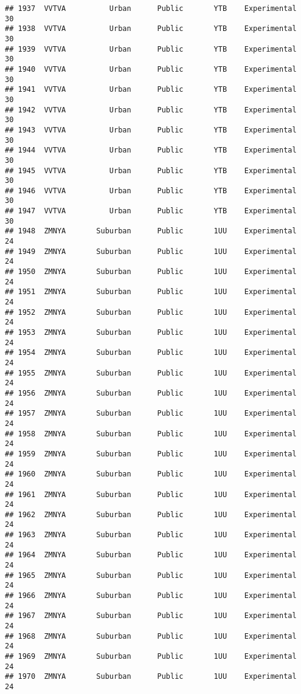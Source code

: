 \documentclass[
]{article}
\begin{document}
\begin{verbatim}
## 1937  VVTVA          Urban      Public       YTB    Experimental        30
## 1938  VVTVA          Urban      Public       YTB    Experimental        30
## 1939  VVTVA          Urban      Public       YTB    Experimental        30
## 1940  VVTVA          Urban      Public       YTB    Experimental        30
## 1941  VVTVA          Urban      Public       YTB    Experimental        30
## 1942  VVTVA          Urban      Public       YTB    Experimental        30
## 1943  VVTVA          Urban      Public       YTB    Experimental        30
## 1944  VVTVA          Urban      Public       YTB    Experimental        30
## 1945  VVTVA          Urban      Public       YTB    Experimental        30
## 1946  VVTVA          Urban      Public       YTB    Experimental        30
## 1947  VVTVA          Urban      Public       YTB    Experimental        30
## 1948  ZMNYA       Suburban      Public       1UU    Experimental        24
## 1949  ZMNYA       Suburban      Public       1UU    Experimental        24
## 1950  ZMNYA       Suburban      Public       1UU    Experimental        24
## 1951  ZMNYA       Suburban      Public       1UU    Experimental        24
## 1952  ZMNYA       Suburban      Public       1UU    Experimental        24
## 1953  ZMNYA       Suburban      Public       1UU    Experimental        24
## 1954  ZMNYA       Suburban      Public       1UU    Experimental        24
## 1955  ZMNYA       Suburban      Public       1UU    Experimental        24
## 1956  ZMNYA       Suburban      Public       1UU    Experimental        24
## 1957  ZMNYA       Suburban      Public       1UU    Experimental        24
## 1958  ZMNYA       Suburban      Public       1UU    Experimental        24
## 1959  ZMNYA       Suburban      Public       1UU    Experimental        24
## 1960  ZMNYA       Suburban      Public       1UU    Experimental        24
## 1961  ZMNYA       Suburban      Public       1UU    Experimental        24
## 1962  ZMNYA       Suburban      Public       1UU    Experimental        24
## 1963  ZMNYA       Suburban      Public       1UU    Experimental        24
## 1964  ZMNYA       Suburban      Public       1UU    Experimental        24
## 1965  ZMNYA       Suburban      Public       1UU    Experimental        24
## 1966  ZMNYA       Suburban      Public       1UU    Experimental        24
## 1967  ZMNYA       Suburban      Public       1UU    Experimental        24
## 1968  ZMNYA       Suburban      Public       1UU    Experimental        24
## 1969  ZMNYA       Suburban      Public       1UU    Experimental        24
## 1970  ZMNYA       Suburban      Public       1UU    Experimental        24

\end{verbatim}
\end{document}
